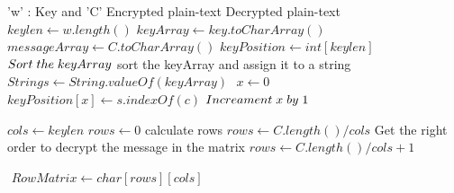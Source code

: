 \documentclass[twoside,twocolumn]{article}
\begin{document}
\begin{algorithm}
  \caption{}\label{}
  \begin{algorithmic}[1]
  	\footnotesize
    \Require 'w' : Key and 'C' Encrypted plain-text
    \Ensure Decrypted plain-text
      \State \footnotesize$ $
      \State $keylen \gets w.length()$
      \State $keyArray \gets key.toCharArray() $
      \State $messageArray \gets C.toCharArray() $
      \State $keyPosition \gets int [keylen]$
      \State \footnotesize$ $
	  \State $Sort\hspace{0.1cm} the \hspace{0.1cm}keyArray$  \Comment \tiny{sort the keyArray and assign it to a string}
	  \State\footnotesize $String s \gets String.valueOf(keyArray)$	  
	  \State \footnotesize$ $
	  \State $x \gets 0$ 
        \State  $keyPosition[x] \gets s.indexOf(c)$
        \State $Increament \hspace{0.1cm} x \hspace{0.1cm} by \hspace{0.1cm}1$	
      \EndFor
      \State \footnotesize$ $
      
      \State $cols \gets keylen$ 
      \State $rows \gets 0$
	   \Comment \tiny{calculate rows}
        \State\footnotesize $rows \gets C.length() / cols$
      \Else \Comment \tiny{Get the right order to decrypt the message in the matrix} \footnotesize
        \State \footnotesize$rows \gets C.length() / cols + 1$
     \EndIf
     
      \State \footnotesize$ $
      \State  $RowMatrix \gets char[rows][cols] $
       

\end{algorithmic}
\end{algorithm}
\end{document}
